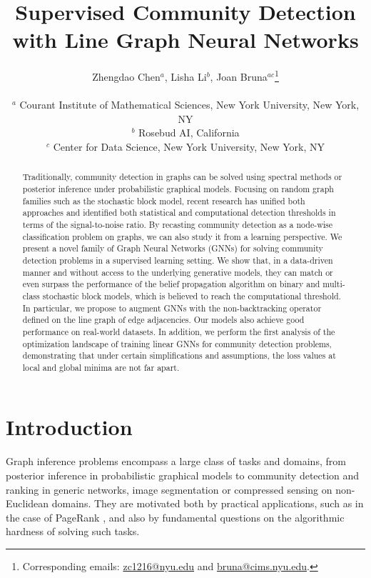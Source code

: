 \documentclass{article} \usepackage{iclr2019_conference,times}
\title{Supervised Community Detection with Line Graph Neural Networks}
\author{Zhengdao Chen$^{a}$, Lisha Li$^{b}$,
Joan Bruna$^{ac}$\thanks{Corresponding emails: \href{mailto:zc1216@nyu.edu}{zc1216@nyu.edu} and \href{mailto:bruna@cims.nyu.edu}{bruna@cims.nyu.edu}.}\\[1ex]
   \hspace{3em}\parbox{0.9\linewidth}{
     $^a$ Courant Institute of Mathematical Sciences, New York University, New York, NY\\
     $^b$ Rosebud AI, California \\
     $^c$ Center for Data Science, New York University, New York, NY}
     }
\begin{document}
\maketitle

\begin{abstract}
Traditionally, community detection in graphs can be solved using spectral methods or posterior inference under probabilistic graphical models. Focusing on random graph families such as the stochastic block model, recent research has unified both approaches and identified both statistical and computational detection thresholds in terms of the signal-to-noise ratio. By recasting community detection as a node-wise classification problem on graphs, we can also study it from a learning perspective.
We present a novel family of Graph Neural Networks (GNNs) for solving community detection problems in a supervised learning setting. We show that, in a data-driven manner and without access to the underlying generative models, they can match or even surpass the performance of the belief propagation algorithm on binary and multi-class stochastic block models, which is believed to reach the computational threshold. In particular, we propose to augment GNNs with the non-backtracking operator defined on the line graph of edge adjacencies. Our models also achieve good performance on real-world datasets.  In addition, we perform the first analysis of the optimization landscape of training linear GNNs for community detection problems, demonstrating that under certain simplifications and assumptions, the loss values at local and global minima are not far apart.
\end{abstract}

\section{Introduction}






Graph inference problems encompass a large class of tasks and domains, from posterior inference in probabilistic graphical models to community detection and ranking in generic networks, image segmentation or compressed sensing on non-Euclidean domains. They are motivated both by practical applications, such as in the case of PageRank \citep{ilprints422}, and also by fundamental questions on the algorithmic hardness of solving such tasks. 
\end{document}
